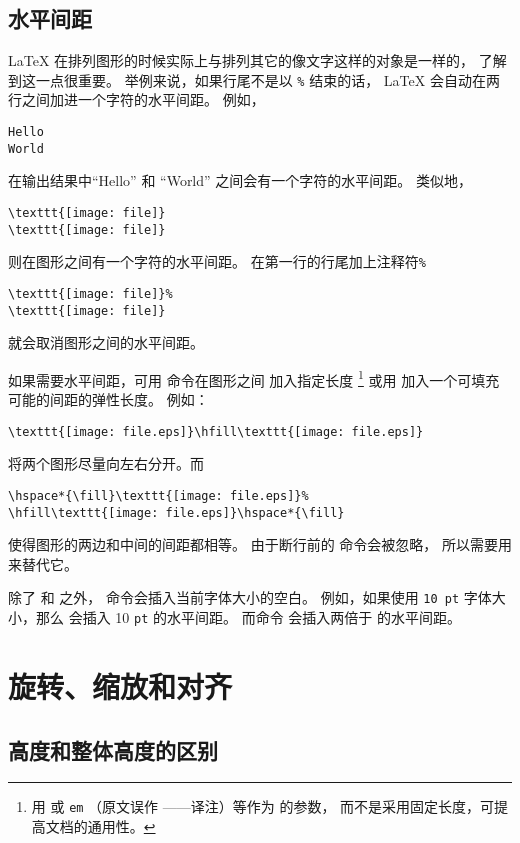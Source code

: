 \subsection{水平间距}\label{ssec:hspace}
\LaTeX{} 在排列图形的时候实际上与排列其它的像文字这样的对象是一样的，
了解到这一点很重要。
举例来说，如果行尾不是以 \texttt{\%} 结束的话，
\LaTeX{} 会自动在两行之间加进一个字符的水平间距。
例如，
\begin{lstlisting}
Hello
World
\end{lstlisting}
在输出结果中``Hello'' 和 ``World'' 之间会有一个字符的水平间距。
类似地，
\begin{lstlisting}
\texttt{[image: file]}
\texttt{[image: file]}
\end{lstlisting}
则在图形之间有一个字符的水平间距。
在第一行的行尾加上注释符\texttt{\%}
\begin{lstlisting}
\texttt{[image: file]}%
\texttt{[image: file]}
\end{lstlisting}
就会取消图形之间的水平间距。

如果需要水平间距，可用  命令在图形之间
加入指定长度
\footnote{
	用  或 \texttt{em} （原文误作 ——译注）等作为  的参数，
	而不是采用固定长度，可提高文档的通用性。}
或用  加入一个可填充可能的间距的弹性长度。
例如：
\begin{lstlisting}
\texttt{[image: file.eps]}\hfill\texttt{[image: file.eps]}
\end{lstlisting}
将两个图形尽量向左右分开。而
\begin{lstlisting}
\hspace*{\fill}\texttt{[image: file.eps]}%
\hfill\texttt{[image: file.eps]}\hspace*{\fill}
\end{lstlisting}
使得图形的两边和中间的间距都相等。
由于断行前的  命令会被忽略，
所以需要用 来替代它。

除了  和  之外，
 命令会插入当前字体大小的空白。
例如，如果使用 \texttt{10 pt} 字体大小，那么  会插入 10 \texttt{pt} 的水平间距。
而命令  会插入两倍于  的水平间距。


\section{旋转、缩放和对齐}\label{sec:rotate-scale-align}

\subsection{高度和整体高度的区别}\label{ssec:diffheight}

